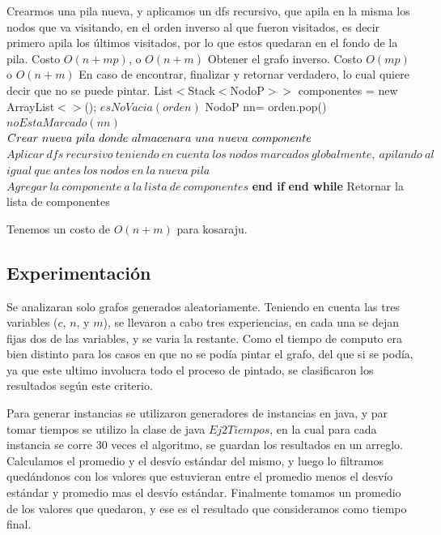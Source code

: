 \begin{codebox}
	\li  Crearmos una pila nueva, y aplicamos un dfs recursivo, que apila en la misma los nodos 
	\li que va visitando, en el orden inverso al que fueron visitados, es decir primero apila los últimos
	\li visitados, por lo que estos quedaran en el fondo de la pila. Costo $ O(n+ mp) $, o $ O(n + m) $
	\li Obtener el grafo inverso. Costo $ O(mp) $ o $ O(n + m) $
	\li En caso de encontrar, finalizar y retornar verdadero, lo cual quiere decir que no se puede pintar.
	\li List$<$Stack$<$NodoP$>>$ componentes = new ArrayList$<>$();  	
	\li \While $ esNoVacia(orden)$ \Do	
	\li NodoP nn= orden.pop()
	\li			\If $ noEstaMarcado(nn)$
	\li	\Then $Crear \ nueva\ pila \ donde \se \ almacenara \ una\ nueva \ componente$
	\li $ Aplicar\ dfs \ recursivo\ teniendo\ en\ cuenta\ los\ nodos\ marcados\ globalmente, \ apilando\ al$ \li $igual\ que\ antes\ los\ nodos\ en \ la \ nueva\ pila $
	\li $ Agregar\ la\ componente\ a\ la\ lista\ de\ componentes $
	 		\End						
	\li \textbf{end if}		\End
\li \textbf{end while} 		
	\li Retornar la lista de componentes

\end{codebox}

Tenemos un costo de $ O(n + m) $ para kosaraju.


\subsection{Experimentación}

Se analizaran solo grafos generados aleatoriamente. Teniendo en cuenta las tres variables ($ c $, $ n $, y $ m $), se llevaron a cabo tres experiencias, en cada una se dejan fijas dos de las variables, y se varia la restante. Como el tiempo de computo era bien distinto para los casos en que no se podía pintar el grafo, del que si se podía, ya que este ultimo involucra todo el proceso de pintado, se clasificaron los resultados según este criterio.

Para generar instancias se utilizaron generadores de instancias en java, y par tomar tiempos se utilizo la clase de java $ Ej2Tiempos $, en la cual para cada instancia se corre 30 veces el algoritmo, se guardan los resultados en un arreglo. Calculamos el promedio  y el desvío estándar del mismo, y luego lo filtramos quedándonos con los valores que estuvieran entre el promedio menos el desvío estándar y promedio mas el desvío estándar. Finalmente tomamos un promedio de los valores que quedaron, y ese es el resultado que consideramos como tiempo final.

